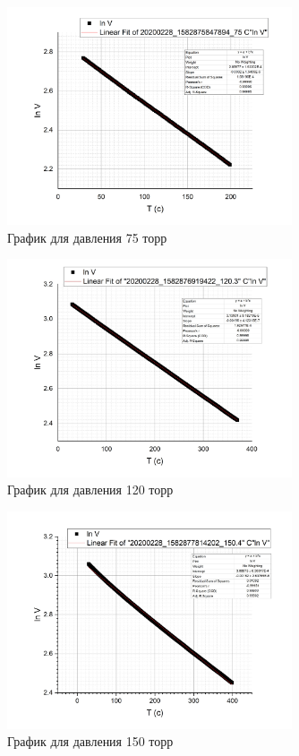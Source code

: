 \documentclass[a4paper]{article}
\begin{document}
\begin{figure}[p]
	\centering
		\includegraphics[width=0.75\textwidth]{G75.jpg}
	\caption{График для давления 75 торр}
	\label{fig:G75}
\end{figure}

\begin{figure}[p]
	\centering
		\includegraphics[width=0.75\textwidth]{G120.jpg}
	\caption{График для давления 120 торр}
	\label{fig:G120}
\end{figure}

\begin{figure}[p]
	\centering
		\includegraphics[width=0.75\textwidth]{G150.jpg}
	\caption{График для давления 150 торр}
	\label{fig:G150}
\end{figure}
\end{document}
